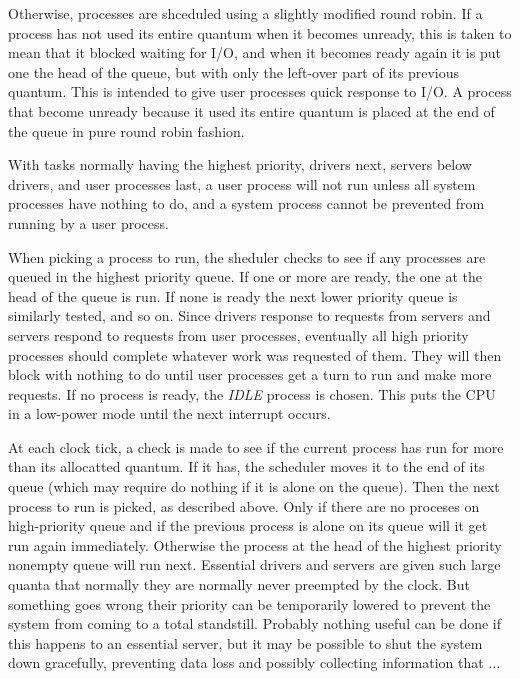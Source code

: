 \documentclass{book}
\newcommand {\sys} [1] {\textsl{#1}}
\begin{document}
Otherwise, processes are shceduled using a slightly modified round robin.
If a process has not used its entire quantum when it becomes unready,
this is taken to mean that it blocked waiting for I/O, and when it becomes ready again it is put one the head of the queue,
but with only the left-over part of its previous quantum.
This is intended to give user processes quick response to I/O.
A process that become unready because it used its entire quantum is placed at the end of the queue in pure round robin fashion.

With tasks normally having the highest priority, drivers next, servers below drivers, and user processes last, 
a user process will not run unless all system processes have nothing to do,
and a system process cannot be prevented from running by a user process.

When picking a process to run, the sheduler checks to see if any processes are queued in the highest priority queue.
If one or more are ready, the one at the head of the queue is run.
If none is ready the next lower priority queue is similarly tested, and so on.
Since drivers response to requests from servers and servers respond to requests from user processes,
eventually all high priority processes should complete whatever work was requested of them.
They will then block with nothing to do until user processes get a turn to run and make more requests.
If no process is ready, the \sys{IDLE} process is chosen.
This puts the CPU in a low-power mode until the next interrupt occurs.

At each clock tick, a check is made to see if the current process has run for more than its allocatted quantum.
If it has, the scheduler moves it to the end of its queue (which may require do nothing if it is alone on the queue).
Then the next process to run is picked, as described above.
Only if there are no proceses on high-priority queue and if the previous process is alone on its queue will it get run again immediately.
Otherwise the process at the head of the highest priority nonempty queue will run next.
Essential drivers and servers are given such large quanta that normally they are normally never preempted by the clock.
But something goes wrong their priority can be temporarily lowered to prevent the system from coming to a total standstill.
Probably nothing useful can be done if this happens to an essential server,
but it may be possible to shut the system down gracefully,
preventing data loss and possibly collecting information that ...
\end{document}
